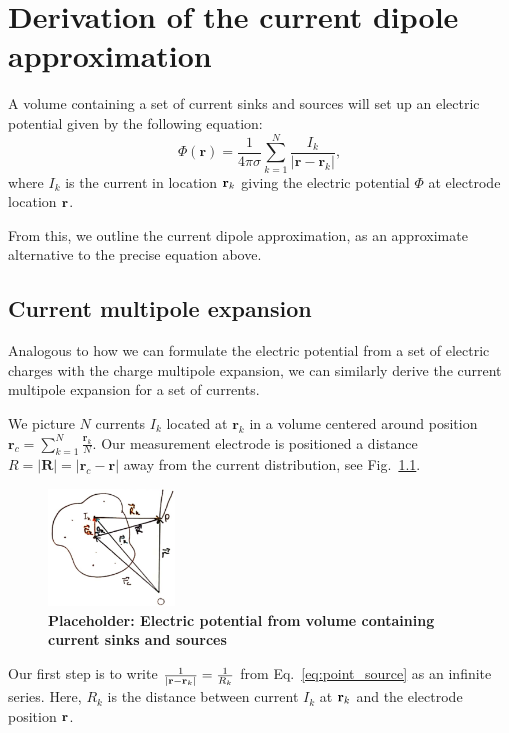 \chapter{Derivation of the current dipole approximation}
\label{app:dipoleappendix}
A volume containing a set of current sinks and sources will set up an electric potential given by the following equation:
\begin{equation}\label{eq:point_source}
\Phi(\mathbf{r}) = \frac{1}{4 \pi \sigma} \sum_{k=1}^N \frac{I_k}{|\mathbf{r} - \mathbf{r}_k|},
\end{equation}
where $I_k$ is the current in location ${\bf r}_k$ giving the electric potential $\Phi$ at electrode location ${\bf r}$.

From this, we outline the current dipole approximation, as an approximate alternative to the precise equation above.

\section{Current multipole expansion}
Analogous to how we can formulate the electric potential from a set of electric charges with the charge multipole expansion, we can similarly derive the current multipole expansion for a set of currents.

We picture $N$ currents $I_k$ located at $\mathbf{r}_k$ in a volume centered around position $\mathbf{r}_c = \sum_{k = 1}^N \frac{\mathbf{r}_k}{N}$. Our measurement electrode is positioned a distance $R = |\mathbf{R}| = |\mathbf{r}_c - \mathbf{r}|$ away from the current distribution, see Fig.~\ref{fig:current_volume}.

\begin{figure}[!ht]
	\begin{center}
		\includegraphics[width=0.3\textwidth]{Figures/placeholder_appB1.png}
	\end{center}
	\caption{\textbf{Placeholder: Electric potential from volume containing current sinks and sources}}
	\label{fig:current_volume}
\end{figure}

Our first step is to write $\frac{1}{|{\bf r} - {\bf r}_k|} = \frac{1}{R_k}$ from Eq.~\ref{eq:point_source} as an infinite series. Here, $R_k$ is the distance between current $I_k$ at ${\bf r}_k$ and the electrode position ${\bf r}$.

